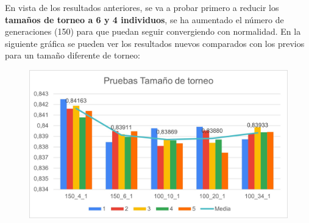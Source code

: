 \documentclass[12pt, spanish, pdftex]{UC3M_document}
\begin{document}
En vista de los resultados anteriores, se va a probar primero a reducir los \textbf{tamaños de torneo a 6 y 4 individuos}, se ha aumentado el número de generaciones (150) para que puedan seguir convergiendo con normalidad. En la siguiente gráfica se pueden ver los resultados nuevos comparados con los previos para un tamaño diferente de torneo:
\begin{figure}[H]
	{\includegraphics[scale=.8]{./img/sizes.jpg}}
\end{figure}
\end{document}
